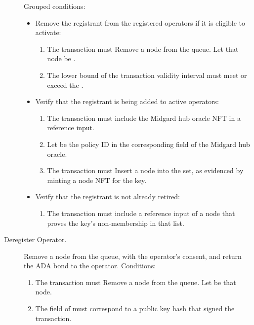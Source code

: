 \documentclass[../midgard.tex]{subfiles}
\begin{document}
\begin{description}
      Grouped conditions:
        \begin{itemize}
            \item Remove the registrant from the registered operators if it is eligible to activate:
            \begin{enumerate}
                \item The transaction must Remove a node from the  queue.
                  Let that node be .
                \item The lower bound of the transaction validity interval must meet or exceed the .
            \end{enumerate}
            \item Verify that the registrant is being added to active operators:
            \begin{enumerate}[resume]
                \item The transaction must include the Midgard hub oracle NFT in a reference input.
                \item Let  be the policy ID in the corresponding field of the Midgard hub oracle.
                \item The transaction must Insert a node into the  set, as evidenced by minting a  node NFT for the  key.
            \end{enumerate}
            \item Verify that the registrant is not already retired:
            \begin{enumerate}[resume]
                \item The transaction must include a reference input of a  node that proves the  key's non-membership in that list.
            \end{enumerate}
        \end{itemize}
    \item[Deregister Operator.] Remove a node from the  queue, with the operator's consent, and return the ADA bond to the operator.
      Conditions:
        \begin{enumerate}
            \item The transaction must Remove a node from the  queue.
              Let  be that node.
            \item The  field of  must correspond to a public key hash that signed the transaction.

\end{enumerate}
\end{description}
\end{document}
